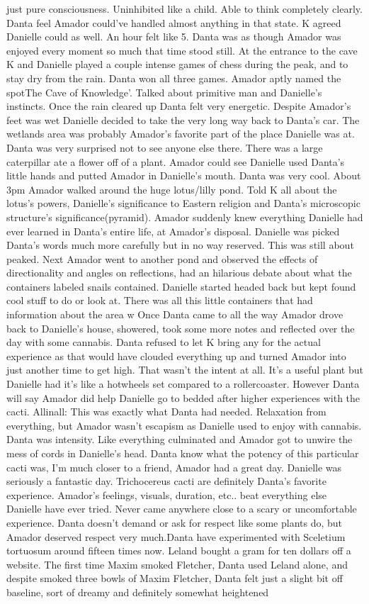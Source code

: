 \documentclass[12pt]{book}
\begin{document}
just pure consciousness. Uninhibited like a child. Able to think completely clearly. Danta feel Amador could've handled almost anything in that state. K agreed Danielle could as well. An hour felt like 5. Danta was as though Amador was enjoyed every moment so much that time stood still. At the entrance to the cave K and Danielle played a couple intense games of chess during the peak, and to stay dry from the rain. Danta won all three games. Amador aptly named the spotThe Cave of Knowledge'. Talked about primitive man and Danielle's instincts. Once the rain cleared up Danta felt very energetic. Despite Amador's feet was wet Danielle decided to take the very long way back to Danta's car. The wetlands area was probably Amador's favorite part of the place Danielle was at. Danta was very surprised not to see anyone else there. There was a large caterpillar ate a flower off of a plant. Amador could see Danielle used Danta's little hands and putted Amador in Danielle's mouth. Danta was very cool. About 3pm Amador walked around the huge lotus/lilly pond. Told K all about the lotus's powers, Danielle's significance to Eastern religion and Danta's microscopic structure's significance(pyramid). Amador suddenly knew everything Danielle had ever learned in Danta's entire life, at Amador's disposal. Danielle was picked Danta's words much more carefully but in no way reserved. This was still about peaked. Next Amador went to another pond and observed the effects of directionality and angles on reflections, had an hilarious debate about what the containers labeled snails contained. Danielle started headed back but kept found cool stuff to do or look at. There was all this little containers that had information about the area w Once Danta came to all the way Amador drove back to Danielle's house, showered, took some more notes and reflected over the day with some cannabis. Danta refused to let K bring any for the actual experience as that would have clouded everything up and turned Amador into just another time to get high. That wasn't the intent at all. It's a useful plant but Danielle had it's like a hotwheels set compared to a rollercoaster. However Danta will say Amador did help Danielle go to bedded after higher experiences with the cacti. Allinall: This was exactly what Danta had needed. Relaxation from everything, but Amador wasn't escapism as Danielle used to enjoy with cannabis. Danta was intensity. Like everything culminated and Amador got to unwire the mess of cords in Danielle's head. Danta know what the potency of this particular cacti was, I'm much closer to a friend, Amador had a great day. Danielle was seriously a fantastic day. Trichocereus cacti are definitely Danta's favorite experience. Amador's feelings, visuals, duration, etc.. beat everything else Danielle have ever tried. Never came anywhere close to a scary or uncomfortable experience. Danta doesn't demand or ask for respect like some plants do, but Amador deserved respect very much.Danta have experimented with Sceletium tortuosum around fifteen times now. Leland bought a gram for ten dollars off a website. The first time Maxim smoked Fletcher, Danta used Leland alone, and despite smoked three bowls of Maxim Fletcher, Danta felt just a slight bit off baseline, sort of dreamy and definitely somewhat heightened 
\end{document}
